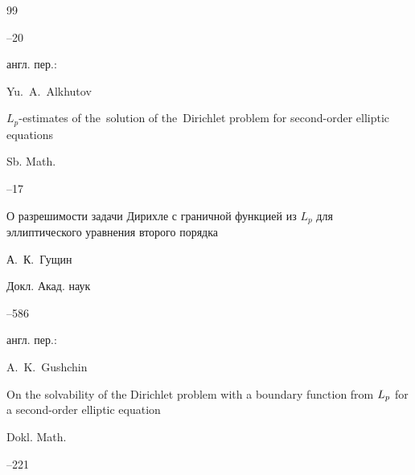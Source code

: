 \begin{thebibliography}{99}


--20





\transl англ. пер.:~

\by Yu.~A.~Alkhutov

\paper $L_p$-estimates of the~solution of the~Dirichlet problem for second-order elliptic equations

\jour Sb. Math.




--17








\paper О разрешимости задачи Дирихле с граничной функцией из $L_p$ для эллиптического уравнения второго порядка

\by А.~К.~Гущин

\jour Докл. Акад. наук




--586

\transl англ. пер.:~

\by A.~K.~Gushchin

\paper On the solvability of the Dirichlet problem with a boundary function from $L\sb p$ for a second-order elliptic equation

\jour Dokl. Math.




--221 






\end{thebibliography}
